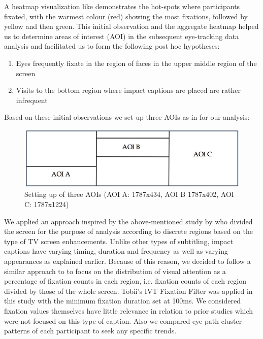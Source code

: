 \documentclass[output=paper]{langsci/langscibook}
\begin{document}
A heatmap visualization like  demonstrates the hot-spots where participants fixated, with the warmest colour (red) showing the most fixations, followed by yellow and then green. This initial observation and the aggregate heatmap helped us to determine areas of interest (AOI) in the subsequent eye-tracking data analysis and facilitated us to form the following post hoc hypotheses:

\begin{enumerate}
\item Eyes frequently fixate in the region of faces in the upper middle region of the screen
\item Visits to the bottom region where impact captions are placed are rather infrequent
\end{enumerate}

Based on these initial observations we set up three AOIs as in  for our analysis:

\begin{figure}
 \includegraphics[width=\textwidth]{figures/OHagan3.png}
	\caption{Setting up of three AOIs (AOI A: 1787x434, AOI B 1787x402, AOI C: 1787x1224)}
	\label{ohagan:fig:3}
\end{figure}

We applied an approach inspired by the above-mentioned study by \citet{josephson2006} who divided the screen for the purpose of analysis according to discrete regions based on the type of TV screen enhancements. Unlike other types of subtitling, impact captions have varying timing, duration and frequency as well as varying appearances as explained earlier.  Because of this reason, we decided to follow a similar approach to \citet{josephson2006} to focus on the distribution of visual attention as a percentage of fixation counts in each region, i.e. fixation counts of each region divided by those of the whole screen.  Tobii's IVT Fixation Filter was applied in this study with the minimum fixation duration set at 100ms. We considered fixation values themselves have little relevance in relation to prior studies which were not focused on this type of caption. Also we compared eye-path cluster patterns of each participant to seek any specific trends.  
\end{document}
